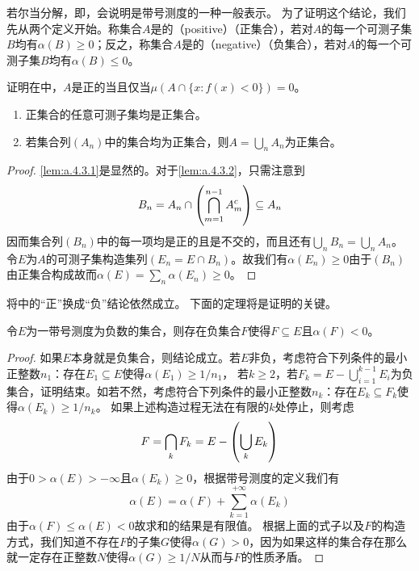 \documentclass[main.tex]{subfiles}
\begin{document}
若尔当分解，即，会说明是带号测度的一种一般表示。
为了证明这个结论，我们先从两个定义开始。称集合\(A\)是的（positive）（正集合），若对\(A\)的每一个可测子集\(B\)均有\(\alpha(B)\geq 0\)；反之，称集合\(A\)是的（negative）（负集合），若对\(A\)的每一个可测子集\(B\)均有\(\alpha(B)\leq 0\)。
\begin{exercise}
	\item 证明在中，\(A\)是正的当且仅当\(\mu(A\cap \{x:f(x)< 0\}) = 0\)。
\end{exercise}
\begin{lemma} \label{lem:a.4.3}
	\begin{enumerate}
		\item \label{lem:a.4.3.1} 正集合的任意可测子集均是正集合。
		\item \label{lem:a.4.3.2} 若集合列\((A_n)\)中的集合均为正集合，则\(A=\bigcup_n A_n\)为正集合。
	\end{enumerate}
\end{lemma}
\begin{proof}
	\ref{lem:a.4.3.1}是显然的。对于\ref{lem:a.4.3.2}，只需注意到
	\[B_n = A_n\cap\del{\bigcap_{m=1}^{n-1}A_m^c} \subseteq A_n\]
	因而集合列\((B_n)\)中的每一项均是正的且是不交的，而且还有\(\bigcup_n B_n = \bigcup_n A_n\)。
	令\(E\)为\(A\)的可测子集构造集列\((E_n = E\cap B_n)\)。故我们有\(\alpha(E_n)\geq 0\)由于\((B_n)\)由正集合构成故而\(\alpha(E) = \sum_n \alpha(E_n) \geq 0\)。
\end{proof}

将中的``正''换成``负''结论依然成立。
下面的定理将是证明的关键。
\begin{lemma} \label{lem:a.4.4}
	令\(E\)为一带号测度为负数的集合，则存在负集合\(F\)使得\(F\subseteq E\)且\(\alpha(F)<0\)。
\end{lemma}
\begin{proof}
	如果\(E\)本身就是负集合，则结论成立。若\(E\)非负，考虑符合下列条件的最小正整数\(n_1\)：存在\(E_1\subseteq E\)使得\(\alpha(E_1) \geq 1/n_1\)，
	若\(k\geq 2\)，若\(F_k = E-\bigcup_{i=1}^{k-1}E_i\)为负集合，证明结束。如若不然，考虑符合下列条件的最小正整数\(n_k\)：存在\(E_k\subseteq F_k\)使得\(\alpha(E_k) \geq 1/n_k\)。
	如果上述构造过程无法在有限的\(k\)处停止，则考虑
	\[F=\bigcap_k F_k = E-\del{\bigcup_k E_k}\]
	由于\(0>\alpha(E)>-\infty\)且\(\alpha(E_k)\geq 0\)，根据带号测度的定义我们有
	\[\alpha(E) = \alpha(F)+\sum_{k=1}^{+\infty}\alpha(E_k)\]
	由于\(\alpha(F)\leq \alpha(E)< 0\)故求和的结果是有限值。
	根据上面的式子以及\(F\)的构造方式，我们知道不存在\(F\)的子集\(G\)使得\(\alpha(G) > 0\)，因为如果这样的集合存在那么就一定存在正整数\(N\)使得\(\alpha(G)\geq 1/N\)从而与\(F\)的性质矛盾。
\end{proof}
\end{document}
